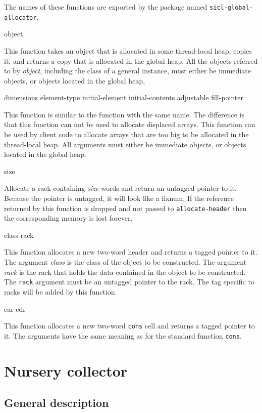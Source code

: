 The names of these functions are exported by the package named
\texttt{sicl-global-allocator}.

 {object}

This function takes an object that is allocated in some thread-local
heap, copies it, and returns a copy that is allocated in the global
heap.  All the objects referred to by \textit{object}, including the
class of a general instance, must either be immediate objects, or
objects located in the global heap,

 {dimensions \key element-type initial-element
  initial-contents adjustable fill-pointer}

This function is similar to the \commonlisp{} function with the same
name.  The difference is that this function can not be used to
allocate displaced arrays.  This function can be used by client code
to allocate arrays that are too big to be allocated in the
thread-local heap.  All arguments must either be immediate objects, or
objects located in the global heap.

 {size}

Allocate a rack containing \textit{size} words and return an untagged
pointer to it.  Because the pointer is untagged, it will look like a
fixnum.  If the reference returned by this function is dropped and not
passed to \texttt{allocate-header} then the corresponding memory is
lost forever.

 {class rack}

This function allocates a new two-word header and returns a tagged
pointer to it.  The argument \textit{class} is the class of the object
to be constructed.  The argument \textit{rack} is the rack that holds
the data contained in the object to be constructed.  The \texttt{rack}
argument must be an untagged pointer to the rack.  The tag specific to
racks will be added by this function.

 {car cdr}

This function allocates a new two-word \texttt{cons} cell and returns
a tagged pointer to it.  The arguments have the same meaning as for
the standard \commonlisp{} function \texttt{cons}.

\section{Nursery collector}

\subsection{General description}

